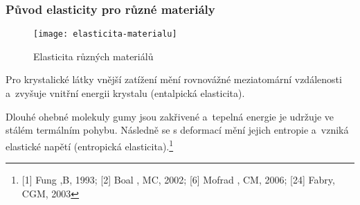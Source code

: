 \subsubsection{Původ elasticity pro různé materiály}
\begin{figure}[H]
	\centering
	\texttt{[image: elasticita-materialu]}
	\caption{Elasticita různých materiálů}
	\label{fig:elasticita-materialu}
\end{figure}

Pro krystalické látky vnější zatížení mění rovnovážné meziatomární vzdálenosti a~zvyšuje vnitřní energii krystalu (entalpická elasticita).

Dlouhé ohebné molekuly gumy jsou zakřivené a~tepelná energie je udržuje ve stálém termálním pohybu.
Následně se s deformací mění jejich entropie a~vzniká elastické napětí (entropická elasticita).\footnote{[1] Fung ,B, 1993; [2] Boal , MC, 2002; [6] Mofrad , CM, 2006; [24] Fabry, CGM, 2003}
